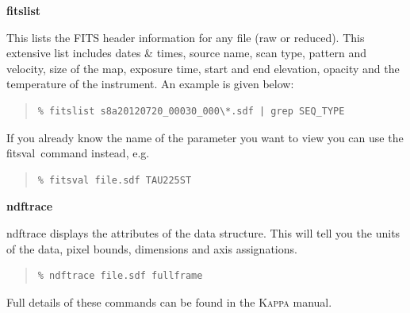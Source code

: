 \documentclass[twoside,11pt]{article}
\newcommand{\xref}[3]{#1}
\renewcommand{\_}{\texttt{\symbol{95}}}
\newenvironment{myquote}{\begin{quote}\begin{small}}{\end{small}\end{quote}}
\newcommand{\task}[1]{\textsf{#1}}
\newcommand{\fitsval}{\xref{\task{fitsval}}{sun95}{FITSVAL}}
\begin{document}
\begin{center}
\begin{minipage}[t]{0.12\linewidth}
\textbf{fitslist}
\end{minipage}
\begin{minipage}[t]{0.75\linewidth}This lists the FITS header information
for any file (raw or reduced). This extensive list includes dates \& times,
source name, scan type, pattern and velocity, size of the map, exposure
time, start and end elevation, opacity and the temperature of the
instrument. An example is given below:
\begin{myquote}
\begin{verbatim}
% fitslist s8a20120720_00030_000\*.sdf | grep SEQ_TYPE
\end{verbatim}
\end{myquote}
If you already know the name of the parameter you want to view you can
use the \fitsval\ command instead, e.g.\\
\begin{myquote}
\begin{verbatim}
% fitsval file.sdf TAU225ST
\end{verbatim}
\end{myquote}
\end{minipage}
\newline


\begin{minipage}[t]{0.1\linewidth} \end{minipage}
\begin{minipage}[t]{0.12\linewidth}
\textbf{ndftrace}
\end{minipage}
\begin{minipage}[t]{0.75\linewidth}
\task{ndftrace} displays the attributes of the data structure. This will tell
you the units of the data, pixel bounds, dimensions and axis assignations.
\begin{myquote}
\begin{verbatim}
% ndftrace file.sdf fullframe
\end{verbatim}
\end{myquote}
\end{minipage}
\vspace{4mm}
\end{center}

Full details of these commands can be found in the \xref{\textsc{Kappa} manual}{sun95}{}.
\end{document}
